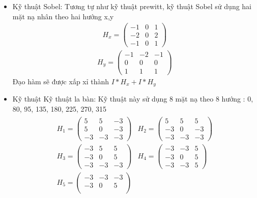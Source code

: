 \documentclass[14pt,oneside,a4paper]{extreport}
\begin{document}
\begin{itemize}
\item Kỹ thuật Sobel:
Tương tự như kỹ thuật prewitt, kỹ thuật Sobel sử dụng hai mặt nạ nhân theo hai hướng x,y
\begin{align*}
   H_x= \begin{pmatrix}
        -1 & 0 & 1 \\
        -2 & 0 & 2  \\
        -1 & 0 & 1
    \end{pmatrix}
\end{align*}
\begin{align*}
   H_y= \begin{pmatrix}
        -1 & -2 & -1 \\
        0 & 0 & 0  \\
        1 & 1 & 1
    \end{pmatrix}
\end{align*}
Đạo hàm sẽ được xấp xỉ thành $I\ast H_x+I\ast H_y$
\item Kỹ thuật Kỹ thuật la bàn: 
Kỹ thuật này sử dụng 8 mặt nạ theo 8 hướng : 0\degree, 80\degree, 95\degree, 135\degree, 180\degree, 225\degree, 270\degree, 315\degree
\begin{align*}
    \begin{matrix}
       H_1= \begin{pmatrix}
        5 & 5 & -3 \\
        5 & 0 & -3  \\
        -3 & -3 & -3
    \end{pmatrix} & H_2=\begin{pmatrix}
        5 & 5 & 5 \\
        -3 & 0 & -3  \\
        -3 & -3 & -3
    \end{pmatrix} \\
        H_3=\begin{pmatrix}
        -3 & 5 & 5 \\
        -3 & 0 & 5  \\
        -3 & -3 & -3
    \end{pmatrix} & H_4=\begin{pmatrix}
        -3 & -3 & 5 \\
        -3 & 0 & 5  \\
        -3 & -3 & 5
    \end{pmatrix}\\
       H_5= \begin{pmatrix}
        -3 & -3 & -3 \\
        -3 & 0 & 5  \\

\end{pmatrix}
\end{matrix}
\end{align*}
\end{itemize}
\end{document}
